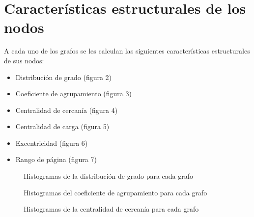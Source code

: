 \documentclass{article}
\begin{document}
\section*{Características estructurales de los nodos}
A cada uno de los grafos se les calculan las siguientes características estructurales de sus nodos:

\begin{itemize}
\item Distribución de grado (figura 2) 
\item Coeficiente de agrupamiento (figura 3) 
\item Centralidad de cercanía (figura 4)	
\item Centralidad de carga (figura 5) 
\item Excentricidad (figura 6)
\item Rango de página (figura 7) 	
\end{itemize}


\begin{figure}[htbp]
\caption{Histogramas de la distribución de grado para cada grafo}
\label{Grado} 
\end{figure}

\begin{figure}[htbp]
\caption{Histogramas del coeficiente de agrupamiento para cada grafo}
\label{CoefA} 
\end{figure}

\begin{figure}[htbp]
\caption{Histogramas de la centralidad de cercanía para cada grafo}
\label{CentCe} 
\end{figure}
\end{document}
